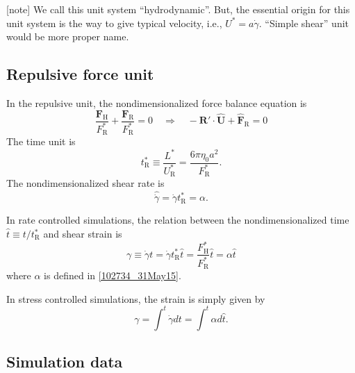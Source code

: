 \documentclass[fontsize=11pt]{scrartcl}
\begin{document}
[note]
We call this unit system ``hydrodynamic''.
But, the essential origin for this unit system
is the way to give typical velocity,
i.e., $U^{\ast} = a \dot{\gamma}$.
%
``Simple shear'' unit would be more proper name.


\subsection*{Repulsive force unit}

In the repulsive unit,
the nondimensionalized
force balance equation is
\begin{equation}
 \frac{\bm{F}_{\mathrm{H}}}{F^{\ast}_{\mathrm{R}}}
  +
  \frac{\bm{F}_{\mathrm{R}}}{F^{\ast}_{\mathrm{R}}}  = 0
      \quad
  \Longrightarrow
    \quad
    - \bm{R}' \cdot \hat{\bm{U}} +
    \hat{\bm{F}}_{\mathrm{R}} = 0
\end{equation}
The time unit is
\begin{equation}
 t_{\mathrm{R}}^{\ast}
  \equiv \frac{L^{\ast}}{U_{\mathrm{R}}^{\ast}}
  = \frac{6 \pi \eta_0 a^2}{F_{\mathrm{R}}^{\ast}}.
\end{equation}
%
The nondimensionalized shear rate is
\begin{equation}
 \hat{\dot{\gamma}} =
  \dot{\gamma} t_{\mathrm{R}}^{\ast}
  = \alpha.
\end{equation}



In rate controlled simulations,
the relation between
the nondimensionalized time
$\hat{t} \equiv t /t_{\mathrm{R}}^{\ast}$
and shear strain is
\begin{equation}
 \gamma
  \equiv \dot{\gamma} t 
  = \dot{\gamma} t_{\mathrm{R}}^{\ast} \hat{t} 
   = 
\frac{F_{\mathrm{H}}^{\ast}}{F_{\mathrm{R}}^{\ast}}
\hat{t} = \alpha \hat{t}
\end{equation}
where $\alpha$ is defined in \eqref{102734_31May15}.

In stress controlled simulations,
the strain is simply given by
\begin{equation}
 \gamma
 = \int^{t} \dot{\gamma} dt
 = \int^{t} \alpha d\hat{t}.
\end{equation}



\subsection*{Simulation data}
\end{document}
